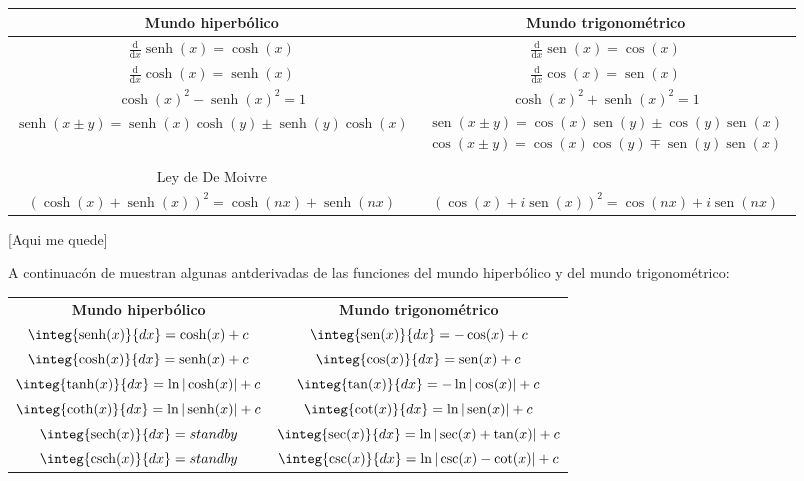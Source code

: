 \documentclass{article}
\numberwithin{equation}{section}
\DeclareMathOperator{\sech}{sech}
\DeclareMathOperator{\sen}{sen}
\DeclareMathOperator{\senh}{senh}
\DeclareMathOperator{\csch}{csch}
\newcommand{\der}[1]{\frac{\mathrm{d}}{\mathrm{d}#1}}
\begin{document}
\hspace{1cm}

\begin{center}
{\tabulinesep=1.2mm
\begin{tabu} {|c|c|}
    \hline
    \textbf{Mundo hiperbólico} &  \textbf{Mundo trigonométrico} \\ 
    \hline
    $\der{x}\senh(x)=\cosh(x)$ & $\der{x}\sen(x)=\cos(x)$ \\
    \hline
    $\der{x}\cosh(x)=\senh(x)$ & $\der{x}\cos(x)=\sen(x)$ \\ [0.5ex]
    \hline
    $\cosh(x)^2-\senh(x)^2=1$ & $\cosh(x)^2+\senh(x)^2=1$ \\
    \hline
$\senh(x\pm y)=\senh(x)\cosh(y)\pm \senh(y)\cosh(x)$ & $\begin{array}{c}
    \sen(x\pm y)=\cos(x)\sen(y)\pm \cos(y)\sen(x) \\ 
    \cos(x\pm y)=\cos(x)\cos(y)\mp \sen(y)\sen(x) \\
\end{array}$ \\
    \hline
    Ley de De Moivre & \\
    $\left(\cosh(x)+\senh(x)\right)^2=\cosh(nx)+\senh(nx)$ & $\left(\cos(x)+i\sen(x)\right)^2=\cos(nx)+i\sen(nx)$ \\
    \hline
\end{tabu}}
\end{center}

[Aqui me quede]

\hspace{1cm}

A continuacón de muestran algunas antderivadas de las funciones del mundo hiperbólico y del mundo trigonométrico:

\hspace{1cm}

\begin{center}
{\tabulinesep=1.2mm
\begin{tabu} {|c|c|}
    \hline
    \textbf{Mundo hiperbólico} &  \textbf{Mundo trigonométrico} \\
    $\integ{\senh(x)}{dx}=\cosh(x)+c$ & $\integ{\sen(x)}{dx}=-\cos(x)+c$ \\
    \hline
    $\integ{\cosh(x)}{dx}=\senh(x)+c$ & $\integ{\cos(x)}{dx}=\sen(x)+c$ \\
    \hline
    $\integ{\tanh(x)}{dx}=\ln|\cosh(x)|+c$ & $\integ{\tan(x)}{dx}=-\ln|\cos(x)|+c$ \\
    \hline
    $\integ{\coth(x)}{dx}=\ln|\senh(x)|+c$ & $\integ{\cot(x)}{dx}=\ln|\sen(x)|+c$ \\
    \hline
    $\integ{\sech(x)}{dx}=standby$ & $\integ{\sec(x)}{dx}=\ln|\sec(x)+\tan(x)|+c$ \\
    \hline
    $\integ{\csch(x)}{dx}=standby$ & $\integ{\csc(x)}{dx}=\ln|\csc(x)-\cot(x)|+c$ \\
    \hline
\end{tabu}}
\end{center}
\end{document}

